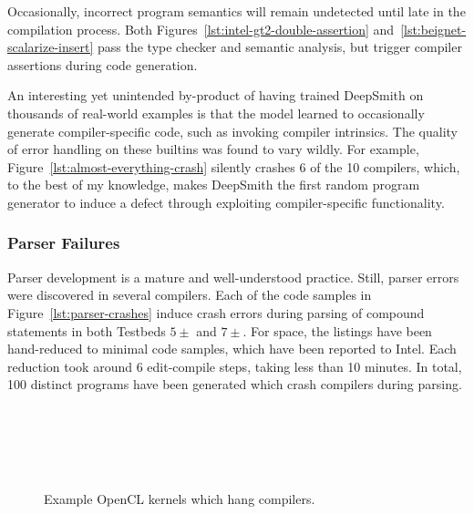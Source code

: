 Occasionally, incorrect program semantics will remain undetected until late in the compilation process. Both Figures~\ref{lst:intel-gt2-double-assertion} and~\ref{lst:beignet-scalarize-insert} pass the type checker and semantic analysis, but trigger compiler assertions during code generation.

An interesting yet unintended by-product of having trained DeepSmith on thousands of real-world examples is that the model learned to occasionally generate compiler-specific code, such as invoking compiler intrinsics. The quality of error handling on these builtins was found to vary wildly. For example, Figure~\ref{lst:almost-everything-crash} silently crashes 6 of the 10 compilers, which, to the best of my knowledge, makes DeepSmith the first random program generator to induce a defect through exploiting compiler-specific functionality.


\subsubsection{Parser Failures}

Parser development is a mature and well-understood practice. Still, parser errors were discovered in several compilers. Each of the code samples in Figure~\ref{lst:parser-crashes} induce crash errors during parsing of compound statements in both Testbeds $5\pm$ and $7\pm$. For space, the listings have been hand-reduced to minimal code samples, which have been reported to Intel. Each reduction took around 6 edit-compile steps, taking less than 10 minutes. In total, 100 distinct programs have been generated which crash compilers during parsing.


\begin{figure}
  \centering %
  \\%
  \\%
  \\%
  \\%
  \caption[Example kernels which hang compilers]{%
    Example OpenCL kernels which hang compilers.%
  }%
  \label{lst:compiler-hangs}
\end{figure}


